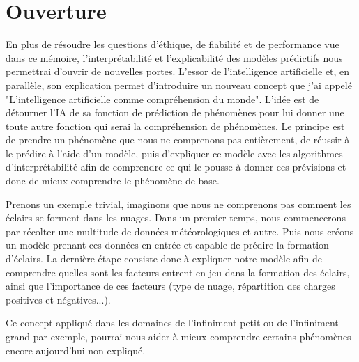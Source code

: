 \chapter*{Ouverture}

En plus de résoudre les questions d'éthique, de fiabilité et de performance vue dans ce mémoire, l'interprétabilité et l'explicabilité des modèles prédictifs nous permettrai d'ouvrir de nouvelles portes. L'essor de l'intelligence artificielle et, en parallèle, son explication permet d'introduire un nouveau concept que j'ai appelé "L'intelligence artificielle comme compréhension du monde". L'idée est de détourner l'IA de sa fonction de prédiction de phénomènes pour lui donner une toute autre fonction qui serai la compréhension de phénomènes. Le principe est de prendre un phénomène que nous ne comprenons pas entièrement, de réussir à le prédire à l'aide d'un modèle, puis d'expliquer ce modèle avec les algorithmes d'interprétabilité afin de comprendre ce qui le pousse à donner ces prévisions et donc de mieux comprendre le phénomène de base.\par
Prenons un exemple trivial, imaginons que nous ne comprenons pas comment les éclairs se forment dans les nuages. Dans un premier temps, nous commencerons par récolter une multitude de données météorologiques et autre. Puis nous créons un modèle prenant ces données en entrée et capable de prédire la formation d'éclairs. La dernière étape consiste donc à expliquer notre modèle afin de comprendre quelles sont les facteurs entrent en jeu dans la formation des éclairs, ainsi que l'importance de ces facteurs (type de nuage, répartition des charges positives et négatives...).\par
Ce concept appliqué dans les domaines de l'infiniment petit ou de l'infiniment grand par exemple, pourrai nous aider à mieux comprendre certains phénomènes encore aujourd'hui non-expliqué.